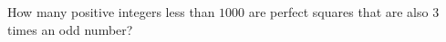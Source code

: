 How many positive integers less than $1000$ are perfect squares that are also $3$ times an odd number?
